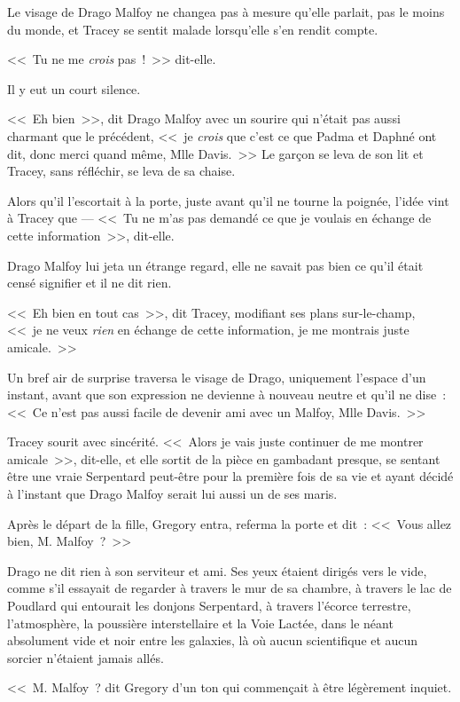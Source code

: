 Le visage de Drago Malfoy ne changea pas à mesure qu'elle parlait, pas le moins du monde, et Tracey se sentit malade lorsqu'elle s'en rendit compte.

<<~Tu ne me \emph{crois} pas~!~>> dit-elle.

Il y eut un court silence.

<<~Eh bien~>>, dit Drago Malfoy avec un sourire qui n'était pas aussi charmant que le précédent, <<~je \emph{crois} que c'est ce que Padma et Daphné ont dit, donc merci quand même, Mlle Davis.~>> Le garçon se leva de son lit et Tracey, sans réfléchir, se leva de sa chaise.

Alors qu'il l'escortait à la porte, juste avant qu'il ne tourne la poignée, l'idée vint à Tracey que — <<~Tu ne m'as pas demandé ce que je voulais en échange de cette information~>>, dit-elle.

Drago Malfoy lui jeta un étrange regard, elle ne savait pas bien ce qu'il était censé signifier et il ne dit rien.

<<~Eh bien en tout cas~>>, dit Tracey, modifiant ses plans sur-le-champ, <<~je ne veux \emph{rien} en échange de cette information, je me montrais juste amicale.~>>

Un bref air de surprise traversa le visage de Drago, uniquement l'espace d'un instant, avant que son expression ne devienne à nouveau neutre et qu'il ne dise~: <<~Ce n'est pas aussi facile de devenir ami avec un Malfoy, Mlle Davis.~>>

Tracey sourit avec sincérité. <<~Alors je vais juste continuer de me montrer amicale~>>, dit-elle, et elle sortit de la pièce en gambadant presque, se sentant être une vraie Serpentard peut-être pour la première fois de sa vie et ayant décidé à l'instant que Drago Malfoy serait lui aussi un de ses maris.

\later

Après le départ de la fille, Gregory entra, referma la porte et dit~: <<~Vous allez bien, M. Malfoy~?~>>

Drago ne dit rien à son serviteur et ami. Ses yeux étaient dirigés vers le vide, comme s'il essayait de regarder à travers le mur de sa chambre, à travers le lac de Poudlard qui entourait les donjons Serpentard, à travers l'écorce terrestre, l'atmosphère, la poussière interstellaire et la Voie Lactée, dans le néant absolument vide et noir entre les galaxies, là où aucun scientifique et aucun sorcier n'étaient jamais allés.

<<~M. Malfoy~? dit Gregory d'un ton qui commençait à être légèrement inquiet.

